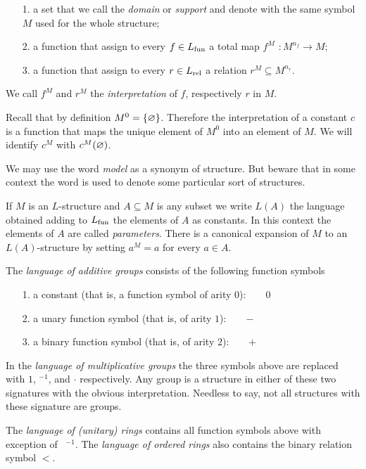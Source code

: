 \begin{itemize}
\item[1.] a set that we call the \emph{domain\/} or \emph{support} and denote with the same symbol $M$ used for the whole structure;
\item[2.] a function that assign to every $f\in L_{\rm fun}$ a total map \emph{$f^M$ $: M^{n_f}\to M$};
\item[3.]a function that assign to every  $r\in L_{\rm rel}$ a relation \emph{$r^M\subseteq M^{n_r}$}.
\end{itemize}
 We call $f^M$ and $r^M$ the \emph{interpretation\/} of $f$, respectively $r$ in $M$.
 
Recall that by definition $M^0=\{\varnothing\}$. Therefore the interpretation of a constant $c$ is a function that maps the unique element of $M^0$ into an element of $M$. We will identify $c^M$ with $c^M(\varnothing)$.

We may use the word \emph{model\/} as a synonym of structure. But beware that in some context the word is used to denote some particular sort of structures.  

If $M$ is an $L$-structure and $A\subseteq M$ is any subset we write \emph{$L(A)$\/} the language obtained adding to $L_{\rm fun}$ the elements of $A$ as constants. In this context the elements of $A$ are called \emph{parameters}. There is a canonical expansion of $M$ to an $L(A)$-structure by setting $a^M=a$ for every $a\in A$.

\begin{example}\label{LgaLgmLau}
The \emph{language of additive groups\/} consists of the following function symbols\nobreak
\begin{itemize}
\item[1.] a constant (that is, a function symbol of arity $0$):\ \ \ \  $0$
\item[2.] a unary function symbol (that is, of arity $1$):\ \ \ \   $-$
\item[3.] a binary function symbol (that is, of arity $2$):\ \ \ \  $+$
\end{itemize}
In the \emph{language of multiplicative groups\/} the three symbols above are replaced with $1$, ${}^{-1}$, and $\cdot$ respectively. Any group is a structure in either of these two signatures with the obvious interpretation. Needless to say, not all structures with these signature are groups. 

The \emph{language of (unitary) rings\/} contains all function symbols above with exception of \ ${}^{-1}$. The  \emph{language of ordered rings\/} also contains the binary relation symbol $<$.\QED
\end{example}


